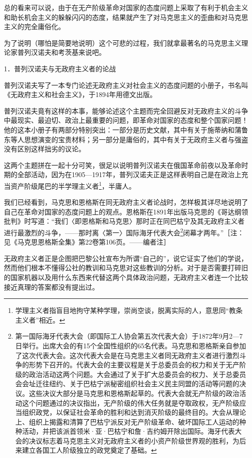 \documentclass[UTF8, 12pt, a4paper]{ctexrep}
\begin{document}
总的看来可以说，由于在无产阶级革命对国家的态度问题上采取了有利于机会主义和助长机会主义的躲躲闪闪的态度，结果就产生了对马克思主义的歪曲和对马克思主义的完全庸俗化。

为了说明（哪怕是简要地说明）这个可悲的过程，我们就拿最著名的马克思主义理论家普列汉诺夫和考茨基来说吧。

1．普列汉诺夫与无政府主义者的论战

普列汉诺夫写了一本专门论述无政府主义对社会主义的态度问题的小册子，书名叫《无政府主义和社会主义》，于1894年用德文出版。

普列汉诺夫竟有这样的本事，能够论述这个主题而完全回避反对无政府主义的斗争中最现实、最迫切、政治上最重要的问题，即革命对国家的态度和整个国家问题！他的这本小册子有两部分特别突出：一部分是历史文献，其中有关于施蒂纳和蒲鲁东等人思想演变的宝贵材料；另一部分是庸俗的，其中有关于无政府主义者与强盗没有区别这样拙劣的议论。

这两个主题拼在一起十分可笑，很足以说明普列汉诺夫在俄国革命前夜以及革命时期的全部活动，因为在1905—1917年，普列汉诺夫正是这样表明自己是在政治上充当资产阶级尾巴的半学理主义者\footnote{学理主义者指盲目地拘守某种学理，崇尚空谈，脱离实际的人，意思同“教条主义者”相近。}，半庸人。

我们已经看到，马克思和恩格斯在同无政府主义者论战时，怎样极其详尽地说明了自己在革命对国家的态度问题上的观点。恩格斯在1891年出版马克思的《哥达纲领批判》时写道：“我们〈即恩格斯和马克思〉那时正在同巴枯宁及其无政府主义者进行最激烈的斗争，——那时离〈第一〉国际海牙代表大会\footnote{第一国际海牙代表大会（即国际工人协会第五次代表大会）于1872年9月2—7日举行。出席大会的有15个全国性组织的65名代表。马克思和恩格斯亲自参加了这次代表大会。这次代表大会是在马克思主义者同无政府主义者进行激烈斗争的形势下召开的。代表大会的主要议程是关于总委员会的权力和关于无产阶级的政治活动这两个问题。大会通过了关于扩大总委员会的权力、关于总委员会会址迁往纽约、关于巴枯宁派秘密组织社会主义民主同盟的活动等问题的决议。这些决议大部分是马克思和恩格斯起草的。代表大会就无产阶级的政治活动这个问题通过的决议指出，无产阶级的伟大任务就是夺取政权，无产阶级应当组织政党，以保证社会革命的胜利和达到消灭阶级的最终目的。大会从理论上、组织上揭露和清算了巴枯宁派反对无产阶级革命、破坏国际工人运动的种种活动，并把该派首领米·亚·巴枯宁和詹·吉约姆开除出国际。海牙代表大会的决议标志着马克思主义对无政府主义者的小资产阶级世界观的胜利，为后来建立各国工人阶级独立的政党奠定了基础。}闭幕才两年。”［注：见《马克思恩格斯全集》第22卷第106页。——编者注］

无政府主义者正是企图把巴黎公社宣布为所谓“自己的”，说它证实了他们的学说，然而他们根本不懂得公社的教训和马克思对这些教训的分析。对于是否需要打碎旧的国家机器以及用什么东西来代替这两个具体政治问题，无政府主义者连一个比较接近真理的答案都没有提出过。
\end{document}
